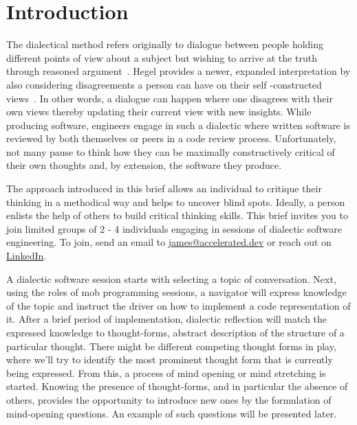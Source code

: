 \section{Introduction}

The dialectical method refers originally to dialogue between people holding different points of view about a subject
but wishing to arrive at the truth through reasoned argument~\citep{wikipedia_dialectic}.
Hegel provides a newer, expanded interpretation by also considering disagreements a person can have on their self
-constructed views~\citep{wikipedia_dialectic}.
In other words, a dialogue can happen where one disagrees with their own views thereby updating their current view
with new insights.
While producing software, engineers engage in such a dialectic where written software is reviewed by both themselves
or peers in a code review process.
Unfortunately, not many pause to think how they can be maximally constructively critical of their own thoughts
and, by extension, the software they produce.

The approach introduced in this brief allows an individual to critique their thinking in a methodical way and
helps to uncover blind spots.
Ideally, a person enlists the help of others to build critical thinking skills.
This brief invites you to join limited groups of 2 - 4 individuals engaging in sessions of dialectic software
engineering.
To join, send an email to \href{mailto:james@accelerated.dev}{james@accelerated.dev} or reach out on \href{https://www.linkedin.com/in/jamescauwelier/}{LinkedIn}.

A dialectic software session starts with selecting a topic of conversation.
Next, using the roles of mob programming sessions, a navigator will express knowledge of the topic and instruct the
driver on how to implement a code representation of it.
After a brief period of implementation, dialectic reflection will match the expressed knowledge to thought-forms,
abstract description of the structure of a particular thought.
There might be different competing thought forms in play, where we'll try to identify the most prominent thought form
that is currently being expressed.
From this, a process of mind opening or mind stretching is started.
Knowing the presence of thought-forms, and in particular the absence of others, provides the opportunity to introduce
new ones by the formulation of mind-opening questions.
An example of such questions will be presented later.
